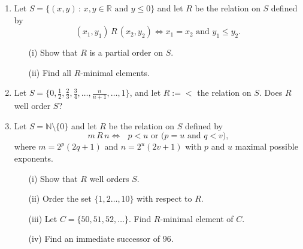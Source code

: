 \documentclass[11pt,paper=b5,footinclude,headinclude]{scrbook} %
\theoremstyle{remark}
\theoremstyle{definition} %
\theoremstyle{theorem} %
\begin{document}
\begin{enumerate}



\item Let $S=\{ (x,y) \,:\, x, y\in\mathbb{R} \textrm{ and } y\leq 0 \}$  and let $R$ be the relation on $S$ defined by 
$$(x_1,y_1)\, R\, (x_2,y_2) \Leftrightarrow  x_1 = x_2 \textrm{ and } y_1\leq y_2.$$
\begin{enumerate}
\item[(i)] Show that $R$ is a partial order on $S$.
\item[(ii)] Find all $R$-minimal elements.
\end{enumerate}



\item Let  $S= \{0,\frac{1}{2}, \frac{2}{3}, \frac{3}{4}, \ldots, \frac{n}{n+1}, \ldots, 1\}$, and let $R:=<$ the relation on $S$. Does $R$ well order $S$?


\item Let $S = \mathbb{N}\setminus \{0\}$ and let  $R$ be the relation on $S$ defined by 
$$m\, R\, n \Leftrightarrow  \textrm{ $p< u$ or ($p=u$ and $q < v$),} $$
where $m=2^p(2q+1)$ and $n=2^u(2v+1)$ with $p$ and $u$ maximal possible exponents.
\begin{enumerate}
\item[(i)] Show that $R$ well orders $S$.
\item[(ii)] Order the set  $\{1,2\ldots, 10\}$ with respect to $R$.
\item[(iii)] Let $C= \{50, 51, 52, \ldots\}$. Find $R$-minimal element of $C$.
\item[(iv)] Find an immediate successor of $96$.
\end{enumerate}



\end{enumerate}
\end{document}
